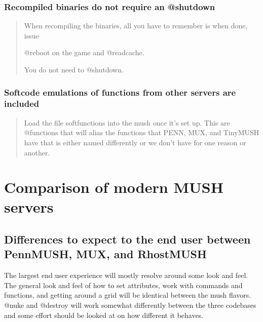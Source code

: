 \documentclass[letterpaper,10pt,english]{sphinxmanual}
\begin{document}
\subsection{Re\sphinxhyphen{}compiled binaries do not require an @shutdown}
\label{\detokenize{features:re-compiled-binaries-do-not-require-an-shutdown}}\begin{quote}

\sphinxAtStartPar
When re\sphinxhyphen{}compiling the binaries, all you have to remember is when done, issue

\sphinxAtStartPar
@reboot on the game and @readcache.

\sphinxAtStartPar
You do not need to @shutdown.
\end{quote}


\subsection{Softcode emulations of functions from other servers are included}
\label{\detokenize{features:softcode-emulations-of-functions-from-other-servers-are-included}}\begin{quote}

\sphinxAtStartPar
Load the file softfunctions into the mush once it’s set up.  This are
@functions that will alias the functions that PENN, MUX, and TinyMUSH have
that is either named differently or we don’t have for one reason or another.
\end{quote}


\chapter{Comparison of modern MUSH servers}
\label{\detokenize{differences:comparison-of-modern-mush-servers}}\label{\detokenize{differences::doc}}

\section{Differences to expect to the end user between PennMUSH, MUX, and RhostMUSH}
\label{\detokenize{differences:differences-to-expect-to-the-end-user-between-pennmush-mux-and-rhostmush}}
\sphinxAtStartPar
The largest end user experience will mostly resolve around some look and feel.
The general look and feel of how to set attributes, work with commands and
functions, and getting around a grid will be identical between the mush flavors.
@nuke and @destroy will work somewhat differently between the three codebases
and some effort should be looked at on how different it behaves.
\end{document}
